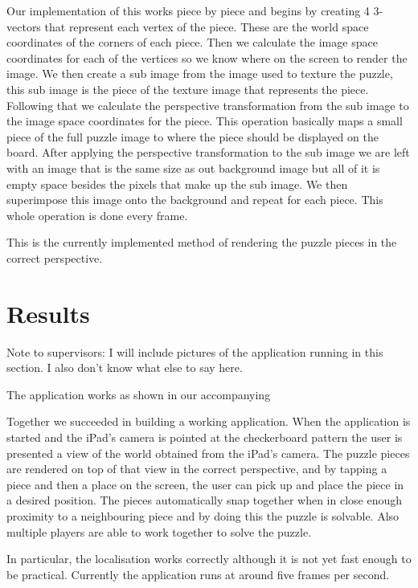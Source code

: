 \documentclass{article}
\begin{document}
Our implementation of this works piece by piece and begins by creating 4 3-vectors that represent each vertex of the piece. These are the world space coordinates of the corners of each piece. Then we calculate the image space coordinates for each of the vertices so we know where on the screen to render the image. We then create a sub image from the image used to texture the puzzle, this sub image is the piece of the texture image that represents the piece. Following that we calculate the perspective transformation from the sub image to the image space coordinates for the piece. This operation basically maps a small piece of the full puzzle image to where the piece should be displayed on the board. After applying the perspective transformation to the sub image we are left with an image that is the same size as out background image but all of it is empty space besides the pixels that make up the sub image. We then superimpose this image onto the background and repeat for each piece. This whole operation is done every frame. 

This is the currently implemented method of rendering the puzzle pieces in the correct perspective.

\section{Results}

Note to supervisors: I will include pictures of the application running in this section. I also don't know what else to say here.

The application works as shown in our accompanying 

Together we succeeded in building a working application. When the application is started and the iPad's camera is pointed at the checkerboard pattern the user is presented a view of the world obtained from the iPad's camera. The puzzle pieces are rendered on top of that view in the correct perspective, and by tapping a piece and then a place on the screen, the user can pick up and place the piece in a desired position. The pieces automatically snap together when in close enough proximity to a neighbouring piece and by doing this the puzzle is solvable. Also multiple players are able to work together to solve the puzzle. 

In particular, the localisation works correctly although it is not yet fast enough to be practical. Currently the application runs at around five frames per second.
\end{document}
